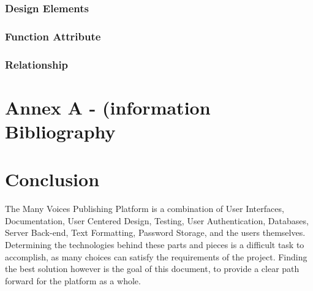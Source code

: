 \documentclass[letterpaper, 10pt, draftclsnofoot, compsoc, onecolumn]{IEEEtran}
\begin{document}
\subsubsection{Design Elements}
{\noindent  \par}

\subsubsection{Function Attribute}
{\noindent  \par}

\subsubsection{Relationship}







\newpage

\section{Annex A - (information Bibliography}

\nocite{*}







\newpage
\section{Conclusion}
{\noindent  The Many Voices Publishing Platform is a combination of User Interfaces, Documentation, User Centered Design, Testing, User Authentication, Databases, Server Back-end, Text Formatting, Password Storage, and the users themselves. Determining the technologies behind these parts and pieces is a difficult task to accomplish, as many choices can satisfy the requirements of the project. Finding the best solution however is the goal of this document, to provide a clear path forward for the platform as a whole. \par}
\end{document}
